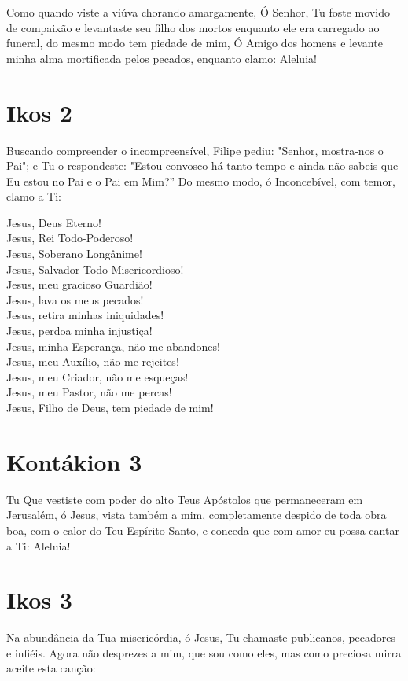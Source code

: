 \documentclass{subfiles}
\begin{document}
Como quando viste a viúva chorando amargamente, Ó Senhor, Tu
foste movido de compaixão e levantaste seu filho dos mortos enquanto ele era
carregado ao funeral, do mesmo modo tem piedade de mim, Ó Amigo dos
homens e levante minha alma mortificada pelos pecados, enquanto clamo:
Aleluia!

\section{Ikos 2}

Buscando compreender o incompreensível, Filipe pediu:
"Senhor, mostra-nos o Pai"; e Tu o respondeste: "Estou convosco há tanto
tempo e ainda não sabeis que Eu estou no Pai e o Pai em Mim?” Do mesmo
modo, ó Inconcebível, com temor, clamo a Ti:

Jesus, Deus Eterno! \\
Jesus, Rei Todo-Poderoso! \\
Jesus, Soberano Longânime! \\
Jesus, Salvador Todo-Misericordioso! \\
Jesus, meu gracioso Guardião! \\
Jesus, lava os meus pecados! \\
Jesus, retira minhas iniquidades! \\
Jesus, perdoa minha injustiça! \\
Jesus, minha Esperança, não me abandones! \\
Jesus, meu Auxílio, não me rejeites! \\
Jesus, meu Criador, não me esqueças! \\
Jesus, meu Pastor, não me percas! \\
Jesus, Filho de Deus, tem piedade de mim!

\section{Kontákion 3}

Tu Que vestiste com poder do alto Teus Apóstolos que permaneceram
em Jerusalém, ó Jesus, vista também a mim, completamente despido de toda
obra boa, com o calor do Teu Espírito Santo, e conceda que com amor eu possa
cantar a Ti: Aleluia!

\section{Ikos 3}

Na abundância da Tua misericórdia, ó Jesus, Tu chamaste publicanos,
pecadores e infiéis. Agora não desprezes a mim, que sou como eles, mas como
preciosa mirra aceite esta canção:
\end{document}
